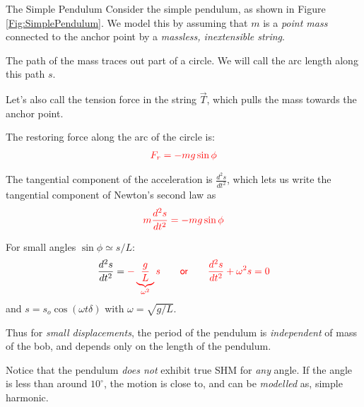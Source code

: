 
\begin{marginfigure}
\caption{The simple pendulum of mass $m$ and length $L$.} \label{Fig:SimplePendulum}
\end{marginfigure}
\begin{examplebox}{The Simple Pendulum}
Consider the simple pendulum, as shown in Figure \ref{Fig:SimplePendulum}. We model this by assuming that $m$ is a \emph{point mass} connected to the anchor point by a \emph{massless, inextensible string}. 

The path of the mass traces out part of a circle. We will call the arc length along this path $s$. 

Let's also call the tension force in the string $\vec{T}$, which pulls the mass towards the anchor point. 

The restoring force along the arc of the circle is:
\begin{align}
\textcolor{red}{F_r = -mg \sin \phi}
\end{align}

The tangential component of the acceleration is $\frac{d^2 s}{dt^2}$, which lets us write the tangential component of Newton's second law as
\begin{align}
\textcolor{red}{m \frac{d^2 s}{dt^2} = -mg \sin \phi}
\end{align}

For small angles $\sin \phi \simeq s/L$:
\begin{align}
\frac{d^2 s}{dt^2} = \textcolor{red}{- \underbrace{\frac{g}{L}}_{\omega^2} s \qquad \textsf{or} \qquad \frac{d^2 s}{dt^2} + \omega^2 s = 0}
\end{align}
and $s = s_o \cos(\omega t \delta)$ with $\omega = \sqrt{g/L}$. 

Thus for \emph{small displacements}, the period of the pendulum is \emph{independent} of mass of the bob, and depends only on the length of the pendulum. 

Notice that the pendulum \emph{does not} exhibit true SHM for \emph{any} angle. If the angle is less than around $10^\circ$, the motion is close to, and can be \emph{modelled} as, simple harmonic. 
\end{examplebox}

